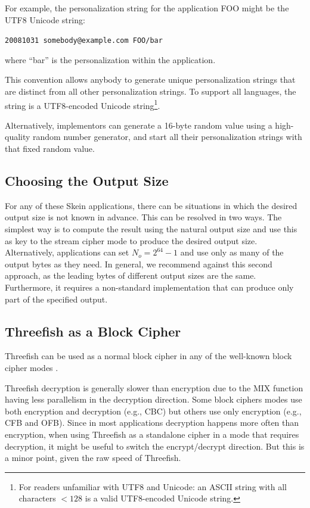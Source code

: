 \documentclass[11pt,twoside]{article}
\begin{document}
For example, the personalization string for the application FOO might be the UTF8 Unicode string:
\begin{center}
\texttt{20081031 somebody@example.com FOO/bar}
\end{center}
where ``bar'' is the personalization within the application.

This convention allows anybody to generate unique personalization strings that are distinct from all other personalization strings.  To support all languages, the string is a UTF8-encoded Unicode string\footnote{For readers unfamiliar with UTF8 and Unicode: an ASCII string with all characters $<128$ is a valid UTF8-encoded Unicode string.}.

Alternatively, implementors can generate a 16-byte random value using a high-quality random number generator, and start all their personalization strings with that fixed random value.

\subsection{Choosing the Output Size}

For any of these Skein applications, there can be situations in which the desired output size is not known in advance. This can be resolved in two ways. The simplest way is to compute the result using the natural output size and use this as key to the stream cipher mode to produce the desired output size. Alternatively, applications can set $N_o = 2^{64}-1$ and use only as many of the output bytes as they need. In general, we recommend against this second approach, as the leading bytes of different output sizes are the same. Furthermore, it requires a non-standard implementation that can produce only part of the specified output.

\subsection{Threefish as a Block Cipher}

Threefish can be used as a normal block cipher in any of the well-known block cipher modes \cite{FS03}.

Threefish decryption is generally slower than encryption due to the MIX function having less parallelism in the decryption direction.  Some block ciphers modes use both encryption and decryption (e.g., CBC) but others use only encryption (e.g., CFB and OFB).  Since in most applications decryption happens more often than encryption, when using Threefish as a standalone cipher in a mode that requires decryption, it might be useful to switch the encrypt/decrypt direction.  But this is a minor point, given the raw speed of Threefish.
\end{document}
